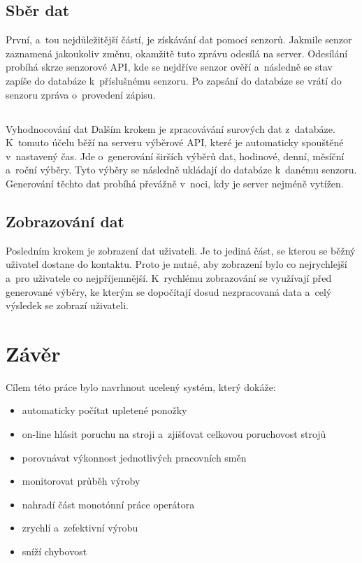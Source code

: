 \documentclass{template/socthesis}
\begin{document}
\subsection{Sběr dat}
První, a~tou nejdůležitější částí, je získávání dat pomocí senzorů.
Jakmile senzor zaznamená jakoukoliv změnu, okamžitě tuto zprávu odesílá na server.
Odesílání probíhá skrze senzorové API, kde se nejdříve senzor ověří a~následně se stav zapíše do databáze k~příslušnému senzoru.
Po zapsání do databáze se vrátí do senzoru zpráva o~provedení zápisu. 


\subsection{}{Vyhodnocování dat}
Dalším krokem je zpracovávání surových dat z~databáze.
K~tomuto účelu běží na serveru výběrové API, které je automaticky spouštěné v~nastavený čas.
Jde o~generování širších výběrů dat, hodinové, denní, měsíční a~roční výběry.
Tyto výběry se následně ukládají do databáze k~danému senzoru.
Generování těchto dat probíhá převážně v~noci, kdy je server nejméně vytížen.


\subsection{Zobrazování dat}
Posledním krokem je zobrazení dat uživateli.
Je to jediná část, se kterou se běžný uživatel dostane do kontaktu.
Proto je nutné, aby zobrazení bylo co nejrychlejší a~pro uživatele co nejpříjemnější.
K~rychlému zobrazování se využívají před generované výběry, ke kterým se dopočítají dosud nezpracovaná data a~celý výsledek se zobrazí uživateli.


\section{Závěr}

Cílem této práce bylo navrhnout ucelený systém, který dokáže:

\begin{itemize}
    \item automaticky počítat upletené ponožky
    \item on-line hlásit poruchu na stroji a~zjišťovat celkovou poruchovost strojů
    \item porovnávat výkonnost jednotlivých pracovních směn
    \item monitorovat průběh výroby
    \item nahradí část monotónní práce operátora
    \item zrychlí a~zefektivní výrobu
    \item sníží chybovost
\end{itemize}
\end{document}
